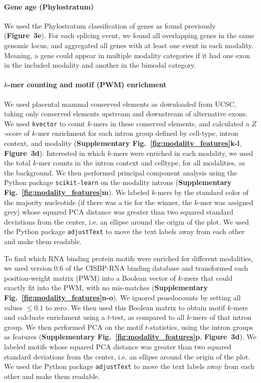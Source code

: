 \paragraph{Gene age (Phylostratum)}

We used the Phylostratum classification of genes as found previously\cite{DomazetLoso:2008ba} (\textbf{Figure~3e}). For each splicing event, we found all overlapping genes in the same genomic locus, and aggregated all genes with at least one event in each modality. Meaning, a gene could appear in multiple modality categories if it had one exon in the included modality and another in the bimodal category.


\paragraph{$k$-mer counting and motif (PWM) enrichment}
We used placental mammal conserved elements as downloaded from UCSC\cite{Rosenbloom:2015bg}, taking only conserved elements upstream and downstream of alternative exons. We used \texttt{kvector}\cite{Anonymous:ug} to count $k$-mers in these conserved elements, and calculated a $Z$-score of $k$-mer enrichment for each intron group defined by cell-type, intron context, and modality (\textbf{Supplementary Fig.~\ref{fig:modality_features}k-l}, \textbf{Figure~3d}). Interested in which $k$-mers were enriched in each modality, we used the total $k$-mer counts in the intron context and celltype, for all modalities, as the background. We then performed principal component analysis using the Python package \texttt{scikit-learn}\cite{Pedregosa:2011tv} on the modality introns (\textbf{Supplementary Fig.~\ref{fig:modality_features}m}). We labeled $k$-mers by the standard color of the majority nucleotide (if there was a tie for the winner, the $k$-mer was assigned grey) whose squared PCA distance was greater than two squared standard deviations from the center, i.e. an ellipse around the origin of the plot. We used the Python package \texttt{adjustText}\cite{Anonymous:tk} to move the text labels away from each other and make them readable.

To find which RNA binding protein motifs were enriched for different modalities, we used version 0.6 of the CISBP-RNA binding database\cite{Ray:2013br} and transformed each position-weight matrix (PWM) into a Boolean vector of $k$-mers that could exactly fit into the PWM, with no mis-matches (\textbf{Supplementary Fig.~\ref{fig:modality_features}n-o}). We ignored psuedocounts by setting all values $\leq 0.1$ to zero. We then used this Boolean matrix to obtain motif $k$-mers and calcluate enrichment using a $t$-test, as compared to all $k$-mers of that intron group. We then performed PCA on the motif $t$-statistics, using the intron groups as features (\textbf{Supplementary Fig.~\ref{fig:modality_features}p}, \textbf{Figure~3d}). We labeled motifs whose squared PCA distance was greater than two squared standard deviations from the center, i.e. an ellipse around the origin of the plot. We used the Python package \texttt{adjustText}\cite{Anonymous:tk} to move the text labels away from each other and make them readable.


